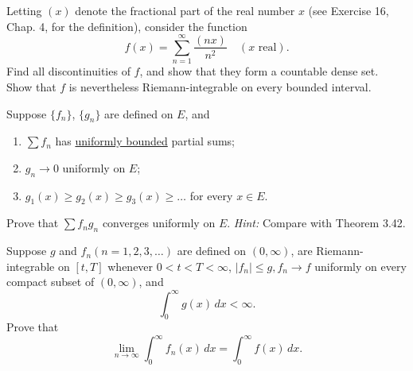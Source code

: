   \begin{exercise}[Rudin 7.10]
    Letting $(x)$ denote the fractional part of the real number $x$ (see Exercise 16, Chap. 4, for the definition), consider the function
    \begin{equation}
      f(x) = \sum_{n=1}^{\infty} \frac{(nx)}{n^2} \quad (x \text{ real}).
    \end{equation}
    Find all discontinuities of $f$, and show that they form a countable dense set. Show that $f$ is nevertheless Riemann-integrable on every bounded interval.
  \end{exercise}
  \begin{solution}

  \end{solution}

  \begin{exercise}[Rudin 7.11]
    Suppose $\{f_n\}$, $\{g_n\}$ are defined on $E$, and
    \begin{enumerate}
      \item[(a)] $\sum f_n$ has \hyperref[def:uniformly-bounded]{uniformly bounded} partial sums;
      \item[(b)] $g_n \to 0$ uniformly on $E$;
      \item[(c)] $g_1(x) \ge g_2(x) \ge g_3(x) \ge \dots$ for every $x \in E$.
    \end{enumerate}
    Prove that $\sum f_n g_n$ converges uniformly on $E$. \textit{Hint:} Compare with Theorem 3.42.
  \end{exercise}
  \begin{solution}

  \end{solution}

  \begin{exercise}[Rudin 7.12]
    Suppose $g$ and $f_n (n = 1, 2, 3, \dots)$ are defined on $(0, \infty)$, are Riemann-integrable on $[t, T]$ whenever $0 < t < T < \infty$, $|f_n| \le g, f_n \to f$ uniformly on every compact subset of $(0, \infty)$, and
    \begin{equation}
      \int_0^\infty g(x) \, dx < \infty.
    \end{equation}
    Prove that
    \begin{equation}
      \lim_{n \to \infty} \int_0^\infty f_n(x) \, dx = \int_0^\infty f(x) \, dx.
    \end{equation}
  \end{exercise}
  \begin{solution}

  \end{solution}

